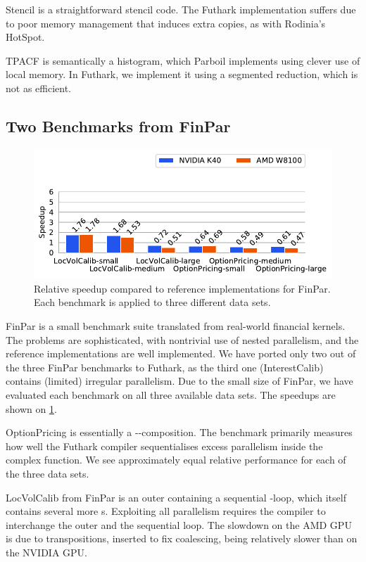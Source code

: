Stencil is a straightforward stencil code.  The Futhark implementation
suffers due to poor memory management that induces extra copies, as
with Rodinia's HotSpot.

TPACF is semantically a histogram, which Parboil implements using
clever use of local memory.  In Futhark, we implement it using a
segmented reduction, which is not as efficient.

\subsection{Two Benchmarks from FinPar}
\label{sec:finpar}

\begin{figure}
  \centering
  \includegraphics[scale=0.65]{experiments/finpar.pdf}
  \caption{Relative speedup compared to reference implementations for
    FinPar.  Each benchmark is applied to three different data sets.}
  \label{fig:finpar-speedup}
\end{figure}

FinPar is a small benchmark suite translated from real-world financial
kernels.  The problems are sophisticated, with nontrivial use of
nested parallelism, and the reference implementations are well
implemented.  We have ported only two out of the three FinPar
benchmarks to Futhark, as the third one (InterestCalib) contains
(limited) irregular parallelism.  Due to the small size of FinPar, we
have evaluated each benchmark on all three available data sets.  The
speedups are shown on \cref{fig:finpar-speedup}.

OptionPricing is essentially a --composition.  The
benchmark primarily measures how well the Futhark compiler
sequentialises excess parallelism inside the complex 
function.  We see approximately equal relative performance for each of
the three data sets.

LocVolCalib from FinPar is an outer  containing a sequential
-loop, which itself contains several more s.
Exploiting all parallelism requires the compiler to interchange the
outer  and the sequential loop.  The slowdown on the AMD GPU
is due to transpositions, inserted to fix coalescing, being relatively
slower than on the NVIDIA GPU.


